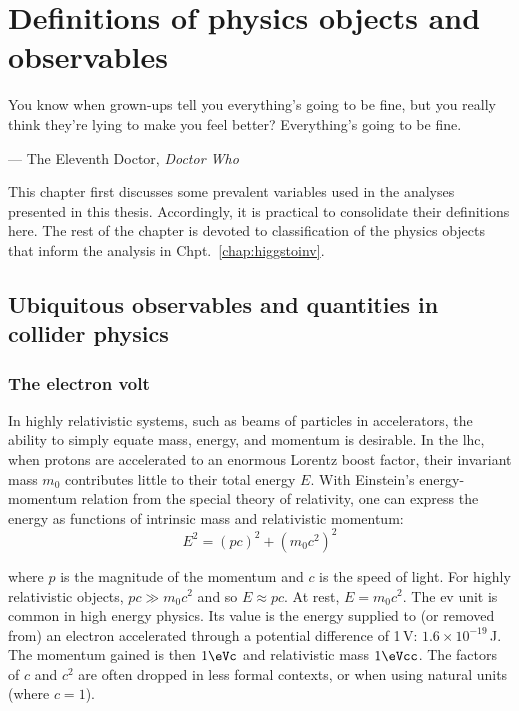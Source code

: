 \chapter{Definitions of physics objects and observables}
\label{chap:objects}


\epigraph{You know when grown-ups tell you everything’s going to be fine, but you really think they’re lying to make you feel better? Everything’s going to be fine.}{--- The Eleventh Doctor, \emph{Doctor Who}}

This chapter first discusses some prevalent variables used in the analyses presented in this thesis. Accordingly, it is practical to consolidate their definitions here. The rest of the chapter is devoted to classification of the physics objects that inform the analysis in Chpt.~\ref{chap:higgstoinv}.




\section{Ubiquitous observables and quantities in collider physics}
\label{sec:objects_important_observables}




\subsection{The electron volt}
\label{subsec:objects_electron_volt}

In highly relativistic systems, such as beams of particles in accelerators, the ability to simply equate mass, energy, and momentum is desirable. In the \acrshort{lhc}, when protons are accelerated to an enormous Lorentz boost factor, their invariant mass $m_0$ contributes little to their total energy $E$. With Einstein's energy-momentum relation from the special theory of relativity, one can express the energy as functions of intrinsic mass and relativistic momentum:
\begin{equation}
    E^2 = (pc)^2 + (m_0c^2)^2
    \label{eq:e_mc2}
\end{equation}

where $p$ is the magnitude of the momentum and $c$ is the speed of light. For highly relativistic objects, $pc \gg m_0c^2$ and so $E \approx pc$. At rest, $E = m_0c^2$. The \acrfull{ev} unit is common in high energy physics. Its value is the energy supplied to (or removed from) an electron accelerated through a potential difference of 1\,V: $\text{1.6}\times \text{10}^{-19}$\,J. The momentum gained is then $\text{1}\eVc$ and relativistic mass $\text{1}\eVcc$. The factors of $c$ and $c^2$ are often dropped in less formal contexts, or when using natural units (where $c = \text{1}$).

